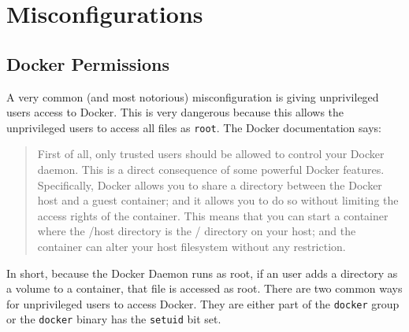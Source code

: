 \section{Misconfigurations}

\subsection{Docker Permissions}
A very common (and most notorious) misconfiguration is giving unprivileged users access to Docker. This is very dangerous because this allows the unprivileged users to access all files as \lstinline{root}. The Docker documentation says\cite{Docker-Daemon-Attack-Surface}: 
\begin{quote}
First of all, only trusted users should be allowed to control your Docker daemon. This is a direct consequence of some powerful Docker features. Specifically, Docker allows you to share a directory between the Docker host and a guest container; and it allows you to do so without limiting the access rights of the container. This means that you can start a container where the /host directory is the / directory on your host; and the container can alter your host filesystem without any restriction.
\end{quote}

In short, because the Docker Daemon runs as root, if an user adds a directory as a volume to a container, that file is accessed as root. There are two common ways for unprivileged users to access Docker. They are either part of the \lstinline{docker} group or the \lstinline{docker} binary has the \lstinline{setuid} bit set.

